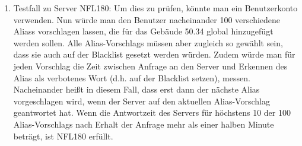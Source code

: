 \begin{enumerate}[label=\textbf{/T\arabic*0/}, align=left]
	\item Testfall zu Server NFL180: Um dies zu prüfen, könnte man ein \Gls{Benutzer}konto verwenden. Nun würde man den \Gls{Benutzer} nacheinander 100 verschiedene \Glspl{Alias} vorschlagen lassen, die für das Gebäude 50.34 \gls{global} hinzugefügt werden sollen. Alle \Glspl{Alias-Vorschlag} müssen aber zugleich so gewählt sein, dass sie auch auf der \Gls{Blacklist} gesetzt werden würden. Zudem würde man für jeden Vorschlag die Zeit zwischen Anfrage an den \Gls{Server} und Erkennen des \Gls{Alias} als verbotenes Wort (d.h. auf der \Gls{Blacklist} setzen), messen. Nacheinander heißt in diesem Fall, dass erst dann der nächste \Gls{Alias} vorgeschlagen wird, wenn der \Gls{Server} auf den aktuellen \Gls{Alias-Vorschlag} geantwortet hat. Wenn die Antwortzeit des \Gls{Server}s für höchstens 10 der 100 \Glspl{Alias-Vorschlag} nach Erhalt der Anfrage mehr als einer halben Minute beträgt, ist NFL180 erfüllt.
\end{enumerate}